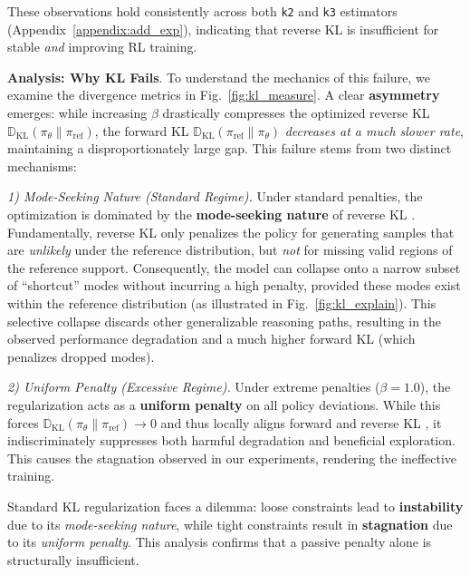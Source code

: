 
These observations hold consistently across both \texttt{k2} and \texttt{k3} estimators (\cf Appendix~\ref{appendix:add_exp}), indicating that reverse KL is insufficient for stable \emph{and} improving RL training.


\textbf{Analysis: Why KL Fails}.
To understand the mechanics of this failure, we examine the divergence metrics in Fig.~\ref{fig:kl_measure}. 
A clear \textbf{asymmetry} emerges:
while increasing $\beta$ drastically compresses the optimized reverse KL $\mathbb{D}_{\text{KL}}(\pi_\theta\|\pi_\text{ref})$, the forward KL $\mathbb{D}_{\text{KL}}(\pi_\text{ref}\|\pi_\theta)$ \emph{decreases at a much slower rate}, maintaining a disproportionately large gap.
This failure stems from two distinct mechanisms:

\textit{1) Mode-Seeking Nature (Standard Regime).} 
Under standard penalties, the optimization is dominated by the \textbf{mode-seeking nature} of reverse KL \citep{beyondkl,klcollapse}. 
Fundamentally, reverse KL only penalizes the policy for generating samples that are \textit{unlikely} under the reference distribution, but \textit{not} for missing valid regions of the reference support.
Consequently, the model can collapse onto a narrow subset of ``shortcut'' modes without incurring a high penalty, provided these modes exist within the reference distribution (as illustrated in Fig.~\ref{fig:kl_explain}).
This selective collapse discards other generalizable reasoning paths, resulting in the observed performance degradation and a much higher forward KL (which penalizes dropped modes).

\textit{2) Uniform Penalty (Excessive Regime).}
Under extreme penalties (\eg $\beta=1.0$), the regularization acts as a \textbf{uniform penalty} on all policy deviations.
While this forces $\mathbb{D}_{\text{KL}}(\pi_\theta\|\pi_\text{ref}) \to 0$ and thus locally aligns forward and reverse KL \citep{klpitfalls}, it indiscriminately suppresses both harmful degradation and beneficial exploration.
This causes the stagnation observed in our experiments, rendering the ineffective training.


\begin{paperbox}
Standard KL regularization faces a dilemma: loose constraints lead to \textbf{instability} due to its \textit{mode-seeking nature}, while tight constraints result in \textbf{stagnation} due to its \textit{uniform penalty}.
This analysis confirms that a passive penalty alone is structurally insufficient. 
\end{paperbox}
